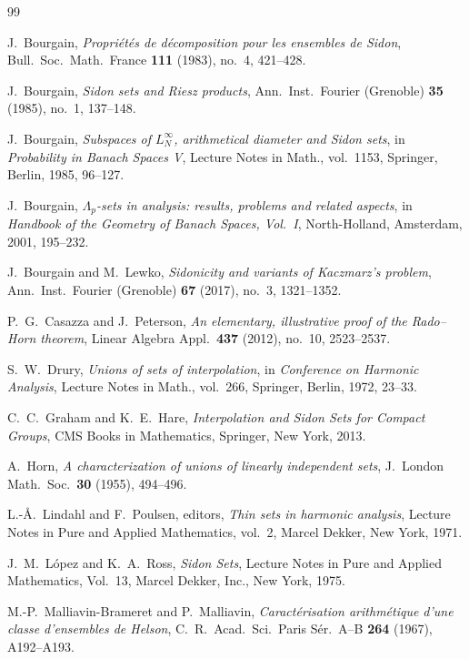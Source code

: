 \documentclass[11pt]{amsart}
\begin{document}
\begin{thebibliography}{99}

J.~Bourgain,
\emph{Propri\'et\'es de d\'ecomposition pour les ensembles de Sidon},
Bull.\ Soc.\ Math.\ France \textbf{111} (1983), no.~4, 421--428.

J.~Bourgain,
\emph{Sidon sets and Riesz products},
Ann.\ Inst.\ Fourier (Grenoble) \textbf{35} (1985), no.~1, 137--148.

J.~Bourgain,
\emph{Subspaces of $L^\infty_N$, arithmetical diameter and Sidon sets},
in \emph{Probability in Banach Spaces V},
Lecture Notes in Math., vol.~1153, Springer, Berlin, 1985, 96--127.

J.~Bourgain,
\emph{$\Lambda_p$-sets in analysis: results, problems and related aspects},
in \emph{Handbook of the Geometry of Banach Spaces, Vol.~I},
North-Holland, Amsterdam, 2001, 195--232.

J.~Bourgain and M.~Lewko,
\emph{Sidonicity and variants of Kaczmarz's problem},
Ann.\ Inst.\ Fourier (Grenoble) \textbf{67} (2017), no.~3, 1321--1352.

P.~G.~Casazza and J.~Peterson,
\emph{An elementary, illustrative proof of the Rado--Horn theorem},
Linear Algebra Appl.\ \textbf{437} (2012), no.~10, 2523--2537.

S.~W.~Drury,
\emph{Unions of sets of interpolation},
in \emph{Conference on Harmonic Analysis},
Lecture Notes in Math., vol.~266,
Springer, Berlin, 1972, 23--33.

C.~C.~Graham and K.~E.~Hare,
\emph{Interpolation and Sidon Sets for Compact Groups},
CMS Books in Mathematics,
Springer, New York, 2013.

A.~Horn,
\emph{A characterization of unions of linearly independent sets},
J.\ London Math.\ Soc.\ \textbf{30} (1955), 494--496.

L.-\AA.~Lindahl and F.~Poulsen, editors,
\emph{Thin sets in harmonic analysis},
Lecture Notes in Pure and Applied Mathematics, vol.~2,
Marcel Dekker, New York, 1971.

J.~M.~L\'opez and K.~A.~Ross,
\emph{Sidon Sets},
Lecture Notes in Pure and Applied Mathematics, Vol.~13,
Marcel Dekker, Inc., New York, 1975.

M.-P.~Malliavin-Brameret and P.~Malliavin,
\emph{Caract\'erisation arithm\'etique d'une classe d'ensembles de Helson},
C.~R.\ Acad.\ Sci.\ Paris S\'er.\ A--B \textbf{264} (1967), A192--A193.


\end{thebibliography}
\end{document}
